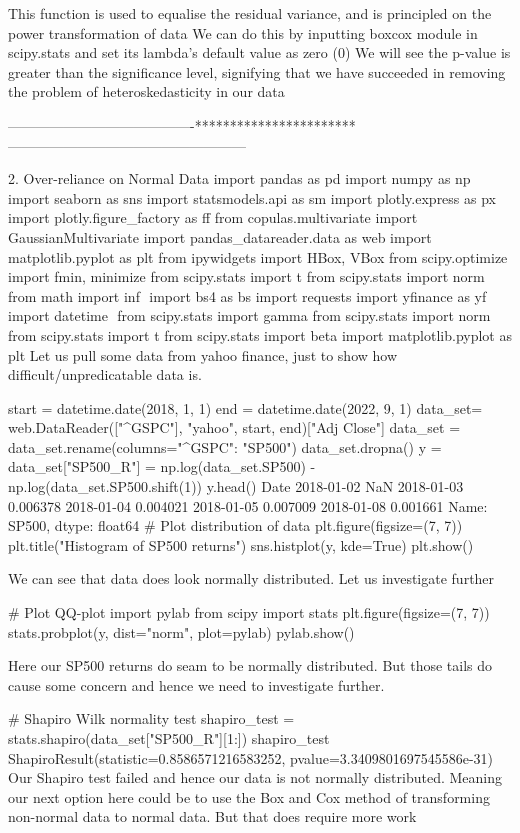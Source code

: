 This function is used to equalise the residual variance, and is principled on the power transformation of data
We can do this by inputting boxcox module in scipy.stats and set its lambda’s default value as zero (0)
We will see the p-value is greater than the significance level, signifying that we have succeeded in removing the problem of heteroskedasticity in our data

----------------------------------------***********************---------------------------------------------------




2. Over-reliance on Normal Data
import pandas as pd
import numpy as np
import seaborn as sns
import statsmodels.api as sm
import plotly.express as px
import plotly.figure_factory as ff
from copulas.multivariate import GaussianMultivariate
import pandas_datareader.data as web
import matplotlib.pyplot as plt
from ipywidgets import HBox, VBox
from scipy.optimize import fmin, minimize
from scipy.stats import t
from scipy.stats import norm
from math import inf
​
import bs4 as bs
import requests
import yfinance as yf
import datetime
​
from scipy.stats import gamma
from scipy.stats import norm
from scipy.stats import t
from scipy.stats import beta
import matplotlib.pyplot as plt
Let us pull some data from yahoo finance, just to show how difficult/unpredicatable data is.

start = datetime.date(2018, 1, 1)
end = datetime.date(2022, 9, 1)
data_set= web.DataReader(["^GSPC"], "yahoo", start, end)["Adj Close"]
data_set = data_set.rename(columns={"^GSPC": "SP500"})
data_set.dropna()
y = data_set["SP500_R"] = np.log(data_set.SP500) - np.log(data_set.SP500.shift(1))
y.head()
Date
2018-01-02         NaN
2018-01-03    0.006378
2018-01-04    0.004021
2018-01-05    0.007009
2018-01-08    0.001661
Name: SP500, dtype: float64
 # Plot distribution of data
plt.figure(figsize=(7, 7))
plt.title("Histogram of SP500 returns")
sns.histplot(y, kde=True)
plt.show()

We can see that data does look normally distributed. Let us investigate further

# Plot QQ-plot
import pylab
from scipy import stats
plt.figure(figsize=(7, 7))
stats.probplot(y, dist="norm", plot=pylab)
pylab.show()

Here our SP500 returns do seam to be normally distributed. But those tails do cause some concern and hence we need to investigate further.

# Shapiro Wilk normality test
shapiro_test = stats.shapiro(data_set["SP500_R"][1:])
shapiro_test
ShapiroResult(statistic=0.8586571216583252, pvalue=3.3409801697545586e-31)
Our Shapiro test failed and hence our data is not normally distributed. Meaning our next option here could be to use the Box and Cox method of transforming non-normal data to normal data. But that does require more work

